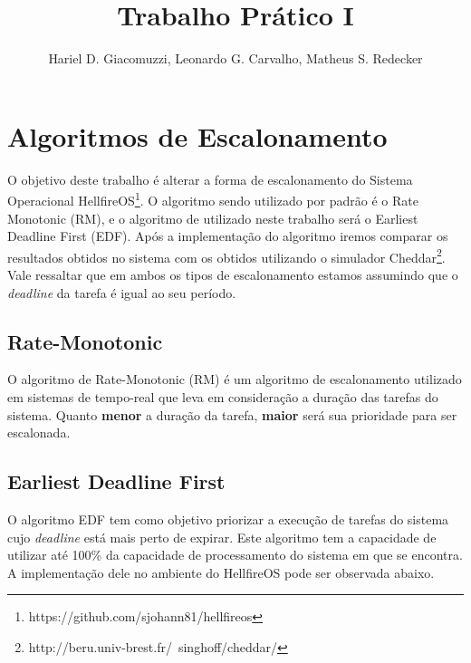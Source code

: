 \documentclass[12pt]{article}
\title{Trabalho Prático I}
\author{Hariel D. Giacomuzzi\inst{1}, Leonardo G. Carvalho\inst{1}, Matheus S. Redecker\inst{1}}
\begin{document}
 

\maketitle
\section{Algoritmos de Escalonamento}
O objetivo deste trabalho é alterar a forma de escalonamento do Sistema Operacional HellfireOS\footnote{https://github.com/sjohann81/hellfireos}. O algoritmo sendo utilizado por padrão é o Rate Monotonic (RM), e o algoritmo de utilizado neste trabalho será o Earliest Deadline First (EDF). Após a implementação do algoritmo iremos comparar os resultados obtidos no sistema com os obtidos utilizando o simulador Cheddar\footnote{http://beru.univ-brest.fr/~singhoff/cheddar/}. Vale ressaltar que em ambos os tipos de escalonamento estamos assumindo que o \textit{deadline} da tarefa é igual ao seu período.

\subsection{Rate-Monotonic}
O algoritmo de Rate-Monotonic (RM) é um algoritmo de escalonamento utilizado em sistemas de tempo-real que leva em consideração a duração das tarefas do sistema. Quanto \textbf{menor} a duração da tarefa, \textbf{maior} será sua prioridade para ser escalonada.

\subsection{Earliest Deadline First}
O algoritmo EDF tem como objetivo priorizar a execução de tarefas do sistema cujo \newline \textit{deadline} está mais perto de expirar. Este algoritmo tem a capacidade de utilizar até 100\% da capacidade de processamento do sistema em que se encontra. A implementação dele no ambiente do HellfireOS pode ser observada abaixo.
\end{document}
